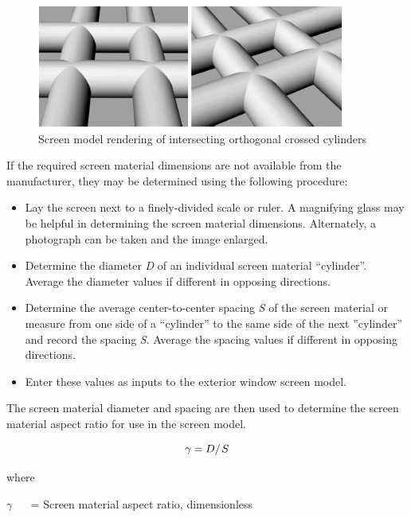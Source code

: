 \begin{figure}[hbtp] %
\centering
\includegraphics[width=0.9\textwidth, height=0.9\textheight, keepaspectratio=true]{media/image1148.png}
\caption{Screen model rendering of intersecting orthogonal crossed cylinders \protect \label{fig:screen-model-rendering-of-intersecting}}
\end{figure}

If the required screen material dimensions are not available from the manufacturer, they may be determined using the following procedure:

\begin{itemize}
\item
  Lay the screen next to a finely-divided scale or ruler. A magnifying glass may be helpful in determining the screen material dimensions. Alternately, a photograph can be taken and the image enlarged.
\item
  Determine the diameter \emph{D} of an individual screen material ``cylinder''. Average the diameter values if different in opposing directions.
\item
  Determine the average center-to-center spacing \emph{S} of the screen material or measure from one side of a ``cylinder'' to the same side of the next ''cylinder'' and record the spacing \emph{S}. Average the spacing values if different in opposing directions.
\item
  Enter these values as inputs to the exterior window screen model.
\end{itemize}

The screen material diameter and spacing are then used to determine the screen material aspect ratio for use in the screen model.

\begin{equation}
\gamma  = {D \mathord{\left/ {\vphantom {D S}} \right. } S}
\end{equation}

where

\(\gamma\) ~~ = Screen material aspect ratio, dimensionless

